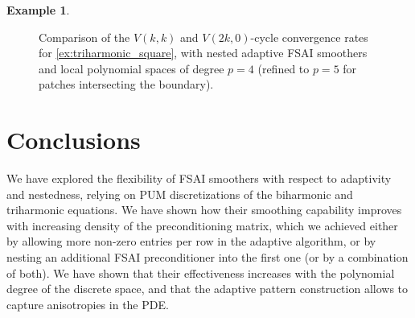 \documentclass[a4paper]{article}
\theoremstyle{plain}
\theoremstyle{definition}
\newtheorem{example}{Example}[section]
\theoremstyle{remark}
\begin{document}
\begin{example}
\begin{figure}[!htbp]
		\caption{Comparison of the \(V(k,k)\) and \(V(2k,0)\)-cycle convergence rates for \cref{ex:triharmonic_square}, with nested adaptive FSAI smoothers and local polynomial spaces of degree \(p = 4\) (refined to \(p = 5\) for patches intersecting the boundary).}
		\label{fig:sym_vs_nonsym_chebyshev_th}
	\end{figure}


\end{example}

\section{Conclusions}\label{sec:conclusions}

We have explored the flexibility of FSAI smoothers with respect to adaptivity and nestedness, relying on PUM discretizations of the biharmonic and triharmonic equations. We have shown how their smoothing capability improves with increasing density of the preconditioning matrix, which we achieved either by allowing more non-zero entries per row in the adaptive algorithm, or by nesting an additional FSAI preconditioner into the first one (or by a combination of both). We have shown that their effectiveness increases with the polynomial degree of the discrete space, and that the adaptive pattern construction allows to capture anisotropies in the PDE.
\end{document}
